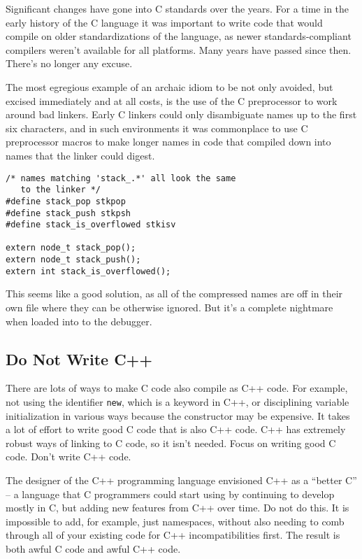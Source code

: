 \documentclass{lulu}
\newcommand{\code}[1]{\texttt{#1}\xspace}
\begin{document}
Significant changes have gone into C standards over the years.  For a
time in the early history of the C language it was important to write
code that would compile on older standardizations of the language, as
newer standards-compliant compilers weren't available for all
platforms.  Many years have passed since then.  There's no longer any
excuse.

The most egregious example of an archaic idiom to be not only avoided,
but excised immediately and at all costs, is the use of the C
preprocessor to work around bad linkers.  Early C linkers could only
disambiguate names up to the first six characters, and in such
environments it was commonplace to use C preprocessor macros to make
longer names in code that compiled down into names that the linker
could digest.

\begin{verbatim}
/* names matching 'stack_.*' all look the same
   to the linker */
#define stack_pop stkpop
#define stack_push stkpsh
#define stack_is_overflowed stkisv

extern node_t stack_pop();
extern node_t stack_push();
extern int stack_is_overflowed();
\end{verbatim}

This seems like a good solution, as all of the compressed names are
off in their own file where they can be otherwise ignored.  But it's a
complete nightmare when loaded into to the debugger.

\subsection{Do Not Write C++}

There are lots of ways to make C code also compile as C++ code.  For
example, not using the identifier \code{new}, which is a keyword in
C++, or disciplining variable initialization in various ways because
the constructor may be expensive.  It takes a lot of effort to write
good C code that is also C++ code.  C++ has extremely robust ways of
linking to C code, so it isn't needed.  Focus on writing good C code.
Don't write C++ code.

The designer of the C++ programming language envisioned C++ as a
``better C'' -- a language that C programmers could start using by
continuing to develop mostly in C, but adding new features from C++
over time.  Do not do this.  It is impossible to add, for example,
just namespaces, without also needing to comb through all of your
existing code for C++ incompatibilities first.  The result is both
awful C code and awful C++ code.
\end{document}
